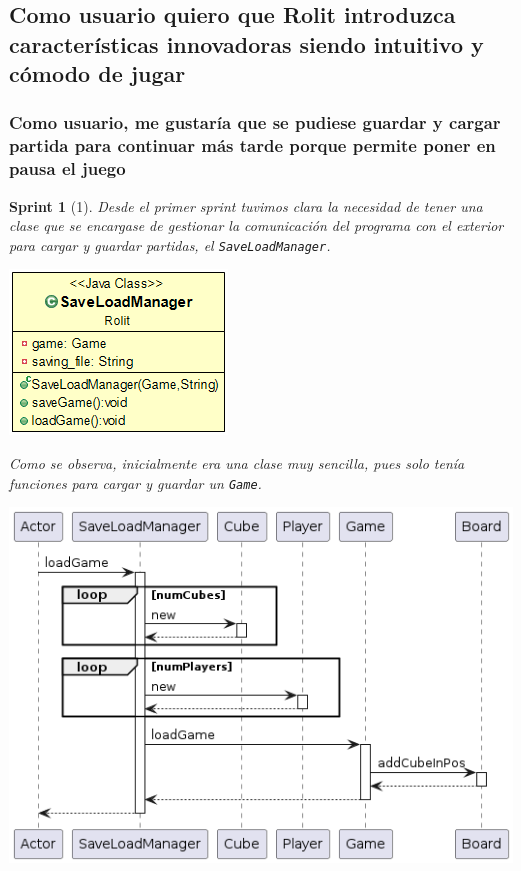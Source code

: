\documentclass[12pt,a4paper,openright]{book}
\theoremstyle{break}
\newtheorem*{sprint}{Sprint}
\begin{document}
\subsection{Como usuario quiero que Rolit introduzca características innovadoras siendo intuitivo y cómodo de jugar}
\subsubsection{Como usuario, me gustaría que se pudiese guardar y cargar partida para continuar más tarde porque permite poner en pausa el juego}
\begin{sprint}[1]
Desde el primer sprint tuvimos clara la necesidad de tener una clase que se encargase de gestionar la comunicación del programa con el exterior para cargar y guardar partidas, el \texttt{SaveLoadManager}.

\begin{center}
\centering
\includegraphics[scale=0.5]{save-load-manager-sprint1.png}
\end{center}

Como se observa, inicialmente era una clase muy sencilla, pues solo tenía funciones para cargar y guardar un \texttt{Game}.

\begin{center}
\centering
\includegraphics[scale=0.5]{load-sprint1.png}


\end{center}
\end{sprint}
\end{document}
